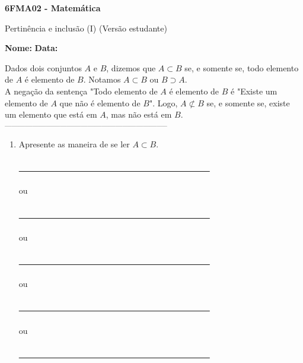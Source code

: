 \documentclass[a4paper,14pt]{article}
\begin{document}
	
	\noindent\textbf{6FMA02 - Matemática} 
	
	\begin{center}Pertinência e inclusão (I) (Versão estudante)
	\end{center}
	
	\noindent\textbf{Nome:} \underline{\hspace{10cm}}
	\noindent\textbf{Data:} \underline{\hspace{4cm}}
	
	
	\begin{multicols}{2}
		\noindent Dados dois conjuntos $A$ e $B$, dizemos que $A \subset B$ se, e somente se, todo elemento de $A$ é elemento de $B$. Notamos $A \subset B$ ou $B \supset A$. \\
		A negação da sentença "Todo elemento de $A$ é elemento de $B$ é "Existe um elemento de $A$ que não é elemento de $B$". Logo, $A \not\subset B$ se, e somente se, existe um elemento que está em $A$, mas não está em $B$.
		\noindent\textsubscript{-----------------------------------------------------------------------}
		\begin{enumerate}
			\item Apresente as maneira de se ler $A \subset B$. \\\\
			\underline{~~~~~~~~~~~~~~~~~~~~~~~~~~~~~~~~~~~~~~~~~~~~~~} \\\\
			ou \\\\
			\underline{~~~~~~~~~~~~~~~~~~~~~~~~~~~~~~~~~~~~~~~~~~~~~~} \\\\
			ou \\\\
			\underline{~~~~~~~~~~~~~~~~~~~~~~~~~~~~~~~~~~~~~~~~~~~~~~} \\\\
			ou \\\\
			\underline{~~~~~~~~~~~~~~~~~~~~~~~~~~~~~~~~~~~~~~~~~~~~~~} \\\\
			ou \\\\
			\underline{~~~~~~~~~~~~~~~~~~~~~~~~~~~~~~~~~~~~~~~~~~~~~~}
			

\end{enumerate}
\end{multicols}
\end{document}
